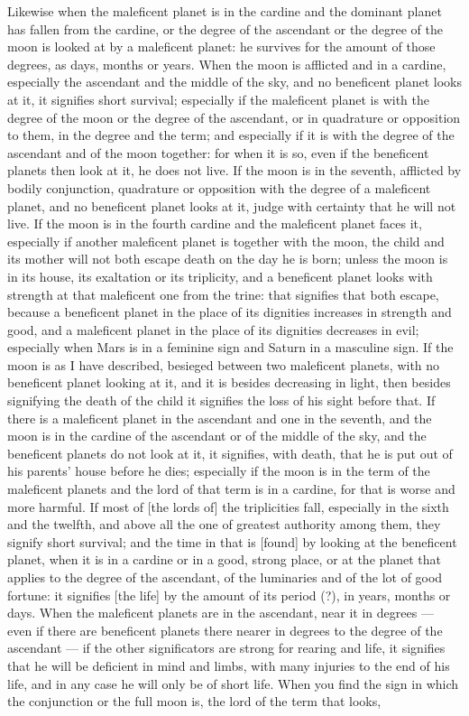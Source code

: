 \documentclass[11pt]{article}
\newcommand{\Fol}[1]{\marginpar{\footnotesize\color{gray}f.\,#1}}
\begin{document}
\par \Fol{45r}Likewise when the maleficent planet is in the cardine and the dominant planet has fallen from the cardine, or the degree of the ascendant or the degree of the moon is looked at by a maleficent planet: he survives for the amount of those degrees, as days, months or years. When the moon is afflicted and in a cardine, especially the ascendant and the middle of the sky, and no beneficent planet looks at it, it signifies short survival; especially if the maleficent planet is with the degree of the moon or the degree of the ascendant, or in quadrature or opposition to them, in the degree and the term; and especially if it is with the degree of the ascendant and of the moon together: for when it is so, even if the beneficent planets then look at it, he does not live. If the moon is in the seventh, afflicted by bodily conjunction, quadrature or opposition with the degree of a maleficent planet, and no beneficent planet looks at it, judge with certainty that he will not live. If the moon is in the fourth cardine and the maleficent planet faces it, especially if another maleficent planet is together with the moon, the child and its mother will not both escape death on the day he is born; unless the moon is in its house, its exaltation or its triplicity, and a beneficent planet looks with strength at that maleficent one from the trine: that signifies that both escape, because a beneficent planet in the place of its dignities increases in strength and good, and a maleficent planet in the place of its dignities decreases in evil; especially when Mars is in a feminine sign and Saturn in a masculine sign. If the moon is as I have described, besieged between two maleficent planets, with no beneficent planet looking at it, and it is besides decreasing in light, then besides signifying the death of the child it signifies the loss of his sight before that. If there is a maleficent planet in the ascendant and one in the seventh, and the moon is in the cardine of the ascendant or of the middle of the sky, and the beneficent planets do not look at it, it signifies, with death, that he is put out of his parents' house before he dies; especially if the moon is in the term of the maleficent planets and the lord of that term is in a cardine, for that is worse and more harmful. If most of [the lords of] the triplicities fall, especially in the sixth and the twelfth, and above all the one of greatest authority among them, they signify short survival; and the time in that is [found] by looking at the beneficent planet, when it is in a cardine or in a good, strong place, or at the planet that applies to the degree of the ascendant, of the luminaries and of the lot of good fortune: it signifies [the life] by the amount of its period (?), in years, months or days. When the maleficent planets are in the ascendant, near it in degrees — even if there are beneficent planets there nearer in degrees to the degree of the ascendant — if the other significators are strong for rearing and life, it signifies that he will be deficient in mind and limbs, with many injuries to the end of his life, and in any case he will only be of short life. When you find the sign in which the conjunction or the full moon is, the lord of the term that looks, 
\end{document}
